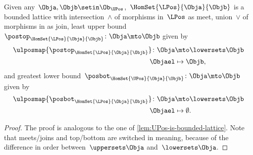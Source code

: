 \begin{lemma}
    \label{lem:LPos-is-bounded-lattice}
    Given any~$\Obja,\Objb\setin \Ob_\UPos$,~$\HomSet{\LPos}{\Obja}{\Objb}$ is a bounded lattice with intersection~$\wedge$ of morphisms in~$\LPos$ as meet, union~$\vee$ of morphisms in \LPos as join, least upper bound~$\postop_{\HomSet{\LPos}{\Obja}{\Objb}}\colon \Obja \mto \Objb$ given by
    \begin{equation*}
        \begin{aligned}
            \ulposmap{\postop_{\HomSet{\LPos}{\Obja}{\Objb}}}\colon \Obja & \mto \lowersets \Objb \\
            \Objael                                                       & \mapsto \Objb,
        \end{aligned}
    \end{equation*}
    and greatest lower bound~$\posbot_{\HomSet{\UPos}{\Obja}{\Objb}}\colon \Obja \mto \Objb$ given by
    \begin{equation*}
        \begin{aligned}
            \ulposmap{\posbot_{\HomSet{\LPos}{\Obja}{\Objb}}}\colon \Obja & \mto \lowersets \Objb \\
            \Objael                                                       & \mapsto \emptyset.
        \end{aligned}
    \end{equation*}
\end{lemma}
\begin{proof}
    The proof is analogous to the one of \cref{lem:UPos-is-bounded-lattice}.
    Note that meets/joins and top/bottom are switched in meaning, because of the difference in order between~$\uppersets \Obja$ and~$\lowersets \Obja$.
\end{proof}

